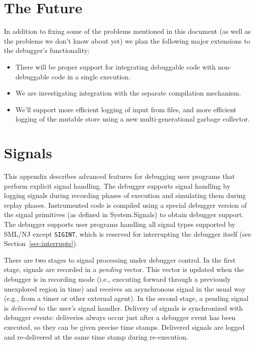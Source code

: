 \section{The Future}
\label{sec:future}
In addition to fixing some of the problems mentioned in this document
(as well as the problems we don't know about yet) we plan the following
major extensions to the debugger's functionality:
\begin{itemize}
\item There will be proper support for integrating debuggable code with 
non-debuggable code in a single execution.
\item We are investigating integration with the separate compilation 
mechanism.
\item We'll support more efficient logging of input from files, and more
efficient logging of the mutable store using a new multi-generational garbage
collector.
\end{itemize}

\appendix
\section{Signals}
\label{sec:signals}
This appendix describes advanced features for debugging user programs
that perform explicit signal handling.  The debugger supports signal
handling by logging signals during recording
phases of execution and simulating them during replay phases.
Instrumented code is compiled using a special debugger version of the 
signal primitives (as defined in System.Signals) to obtain debugger support.
The debugger supports user programs handling all signal types supported by
SML/NJ except {\tt SIGINT}, which is reserved for interrupting the debugger
itself (see Section~\ref{sec:interrupts}).

There are two stages to signal processing under debugger control. 
In the first stage, signals are recorded in a {\em pending} vector.  This
vector is updated when the debugger is in recording mode (i.e.,
executing forward through a previously unexplored region in time)
and receives an asynchronous signal in the usual way (e.g., from a 
timer or other external agent).  
In the second stage, a pending signal is {\em delivered} to the user's
signal handler.  Delivery of signals is synchronized with debugger 
events: deliveries always occur just after a debugger event has been
executed, so they can be given precise time stamps.  Delivered signals
are logged and re-delivered at the same time stamp during re-execution.

